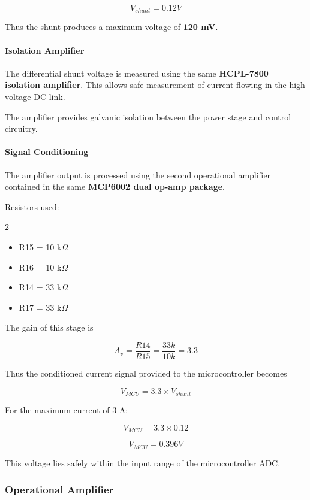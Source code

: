 \[
V_{shunt} = 0.12V
\]

Thus the shunt produces a maximum voltage of \textbf{120 mV}.

\paragraph{Isolation Amplifier}

The differential shunt voltage is measured using the same \textbf{HCPL-7800 isolation amplifier}. This allows safe measurement of current flowing in the high voltage DC link.

The amplifier provides galvanic isolation between the power stage and control circuitry.

\paragraph{Signal Conditioning}

The amplifier output is processed using the second operational amplifier contained in the same \textbf{MCP6002 dual op-amp package}.

Resistors used:

\begin{multicols}{2}
\begin{itemize}
\item R15 = 10 k$\Omega$
\item R16 = 10 k$\Omega$
\item R14 = 33 k$\Omega$
\item R17 = 33 k$\Omega$
\end{itemize}
\end{multicols}

The gain of this stage is

\[
A_v = \frac{R14}{R15} = \frac{33k}{10k} = 3.3
\]



Thus the conditioned current signal provided to the microcontroller becomes

\[
V_{MCU} = 3.3 \times V_{shunt}
\]

For the maximum current of 3 A:

\[
V_{MCU} = 3.3 \times 0.12
\]

\[
V_{MCU} = 0.396V
\]

This voltage lies safely within the input range of the microcontroller ADC.

\subsubsection{Operational Amplifier}

